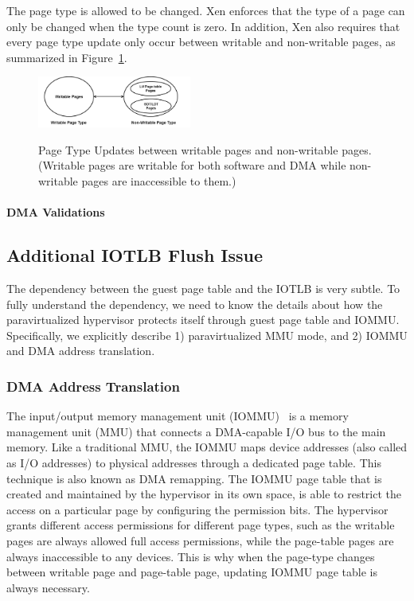 The page type is allowed to be changed.
Xen enforces that the type of a page can only be changed when the type count is zero.
In addition, Xen also requires that every page type update only occur between writable and non-writable pages, as summarized in Figure~\ref{fig:page-type-updates}.

\begin{figure}[ht]
\centering
\includegraphics[width=0.45\textwidth]{image/background/page-type-updates.png} \\
\caption{Page Type Updates between writable pages and non-writable pages. (Writable pages are writable for both software and DMA
while non-writable pages are inaccessible to them.)}
\label{fig:page-type-updates}
\end{figure}


\paragraph{DMA Validations}

\subsection{Additional IOTLB Flush Issue}
The dependency between the guest page table and the IOTLB is very subtle.
To fully understand the dependency, we need to know the details about how the paravirtualized hypervisor protects itself through guest page table and IOMMU.
Specifically, we explicitly describe 1) paravirtualized MMU mode, and 2) IOMMU and DMA address translation.

\subsubsection{DMA Address Translation}
The input/output memory management unit (IOMMU)~\cite{directio} is a memory management unit (MMU) that connects a DMA-capable I/O bus to the main memory.
Like a traditional MMU, the IOMMU maps device addresses (also called as I/O addresses) to physical addresses through a dedicated page table.
This technique is also known as DMA remapping.
The IOMMU page table that is created and maintained by the hypervisor in its own space, is able to restrict the access on a particular page by configuring the permission bits.
The hypervisor grants different access permissions for different page types, such as the writable pages are always allowed full access permissions, while the page-table pages are always inaccessible to any devices.
This is why when the page-type changes between writable page and page-table page, updating IOMMU page table is always necessary.

